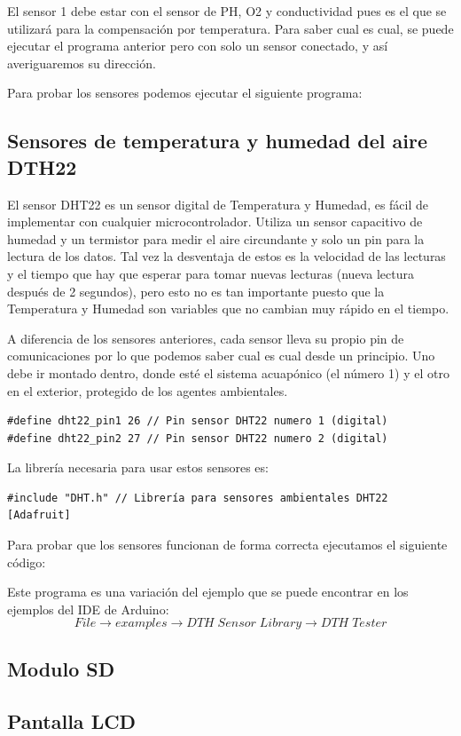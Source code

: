 El sensor 1 debe estar con el sensor de PH, O2 y conductividad pues es el que se utilizará para la compensación por temperatura. Para saber cual es cual, se puede ejecutar el programa anterior pero con solo un sensor conectado, y así averiguaremos su dirección. 

Para probar los sensores podemos ejecutar el siguiente programa:



\newpage

\subsection{Sensores de temperatura y humedad del aire DTH22}

El sensor DHT22 es un sensor digital de Temperatura y Humedad, es fácil de implementar con cualquier microcontrolador. Utiliza un sensor capacitivo de humedad y un termistor para medir el aire circundante y solo un pin para la lectura de los datos. Tal vez la desventaja de estos es la velocidad de las lecturas y  el tiempo que hay que esperar para tomar nuevas lecturas (nueva lectura después de 2 segundos), pero esto no es tan importante puesto que la Temperatura y Humedad son variables que no cambian muy rápido en el tiempo.

A diferencia de los sensores anteriores, cada sensor lleva su propio pin de comunicaciones por lo que podemos saber cual es cual desde un principio. Uno debe ir montado dentro, donde esté el sistema acuapónico (el número 1) y el otro en el exterior, protegido de los agentes ambientales.
\begin{verbatim}
#define dht22_pin1 26 // Pin sensor DHT22 numero 1 (digital) 
#define dht22_pin2 27 // Pin sensor DHT22 numero 2 (digital) 
\end{verbatim}

La librería necesaria para usar estos sensores es:
\begin{verbatim}
#include "DHT.h" // Librería para sensores ambientales DHT22 [Adafruit]
\end{verbatim}

Para probar que los sensores funcionan de forma correcta ejecutamos el siguiente código:



Este programa es una variación del ejemplo que se puede encontrar en los ejemplos del IDE de Arduino:
$$File \rightarrow examples \rightarrow DTH\;Sensor\;Library \rightarrow DTH\;Tester $$
\newpage

\subsection{Modulo SD}

\subsection{Pantalla LCD}